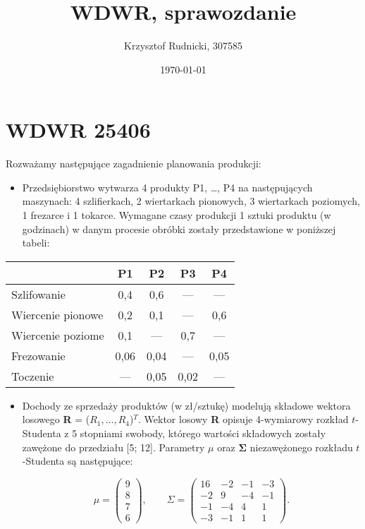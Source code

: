 \documentclass{article}
\title{WDWR, sprawozdanie}
\author{Krzysztof Rudnicki, 307585}
\date{\today}
\begin{document}
\maketitle
\tableofcontents

\section*{WDWR 25406}

Rozważamy następujące zagadnienie planowania produkcji:

\begin{itemize}
\item Przedsiębiorstwo wytwarza 4 produkty P1, 
\ldots, P4 na następujących maszynach: 
4 szlifierkach, 2 wiertarkach pionowych, 
3 wiertarkach poziomych, 1 frezarce i 1 tokarce. 
Wymagane czasy produkcji 1 sztuki produktu (w godzinach) 
w danym procesie obróbki zostały przedstawione w poniższej 
tabeli:
\end{itemize}

\begin{table}[H]
\centering
\begin{tabular}{|l|c|c|c|c|}
\hline
                   & P1   & P2   & P3   & P4   \\
\hline
Szlifowanie       & 0,4  & 0,6  & —    & —    \\
\hline
Wiercenie pionowe & 0,2  & 0,1  & —    & 0,6  \\
\hline
Wiercenie poziome & 0,1  & —    & 0,7  & —    \\
\hline
Frezowanie        & 0,06 & 0,04 & —    & 0,05 \\
\hline
Toczenie          & —    & 0,05 & 0,02 & —    \\
\hline
\end{tabular}
\end{table}

\begin{itemize}
\item Dochody ze sprzedaży produktów (w zł/sztukę) 
modelują składowe wektora losowego 
\textbf{R} = ($R_1, \ldots, R_4$)$^T$. 
Wektor losowy \textbf{R} opisuje 4-wymiarowy rozkład 
$t$-Studenta z 5 stopniami swobody, 
którego wartości składowych zostały zawężone do przedziału 
[5; 12]. Parametry $\mu$ oraz $\mathbf{\Sigma}$ 
niezawężonego rozkładu $t$-Studenta są następujące:

$$
\mu = \begin{pmatrix} 9 \\ 8 \\ 7 \\ 6 \end{pmatrix}, \qquad \Sigma = \begin{pmatrix} 16 & -2 & -1 & -3 \\ -2 & 9 & -4 & -1 \\ -1 & -4 & 4 & 1 \\ -3 & -1 & 1 & 1 \end{pmatrix}.
$$
\end{itemize}
\end{document}
